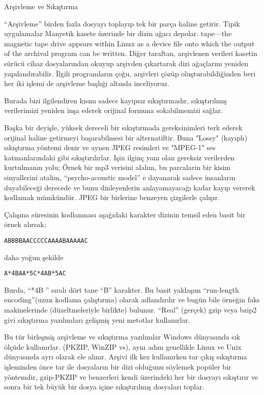 \begin{section}{Arşivleme ve Sıkıştırma}

“Arşivleme” birden fazla dosyayı toplayıp tek bir parça haline getirir. Tipik uygulamalar Manyetik kasete üzerinde bir dizin ağacı depolar. tape—the magnetic tape drive appears within Linux as a device file onto which the output of the archival program can be written. Diğer taraftan, arşivlenen verileri kasetin sürücü cihaz dosyalarından okuyup arşivden çıkartarak dizi ağaçlarını yeniden yapılandırabilir. İlgili programların çoğu, arşivleri
çözüp oluşturabildiğinden beri her iki işlemi de arşivleme başlığı altında inceliyoruz. 

Burada bizi ilgilendiren kısmı sadece kayıpsız sıkıştırmadır, sıkıştırılmış verilerimizi yeniden inşa ederek orijinal formuna sokabilmemizi sağlar.

Başka bir deyişle, yüksek dereceli bir sıkıştırmada gereksinimleri terk ederek orijinal haline getirmeyi başarabilmesi bir alternatiftir. Buna "Lossy" (kayıplı) sıkıştırma yöntemi denir  ve aynen JPEG resimleri ve "MPEG-1" ses katmanlarındaki gibi sıkıştırılırlar. Işin ilginç yanı olan gereksiz verilerden kurtulmanın yolu; Örnek bir mp3 verisini alalım, bu parcalarin bir kisim sinyallerini atalim, “psycho-acoustic model” e dayanarak sadece insanların duyabileceği derecede ve bunu dinleyenlerin anlayamayacağı kadar kayıp vererek kodlamak mümkündür. JPEG bir birlerine benzeyen çizgilerle çalışır.

Çalışma süresinin kodlanması aşağıdaki karakter dizinin temsil eden basit bir örnek alırsak;
\begin{verbatim}
ABBBBAACCCCCAAAABAAAAAC
\end{verbatim}

daha yoğun şekilde
\begin{verbatim}
A*4BAA*5C*4AB*5AC
\end{verbatim}

Burda, “*4B ” sıralı dört tane “B” karakter. Bu basit yaklaşım “run-length encoding”(uzun kodlama çalıştırma) olarak adlandırılır ve bugün bile örneğin faks makinelerinde (düzeltmeleriyle birlikte) bulunur. “Real” (gerçek) gzip veya bzip2 givi sıkıştırma yazılımları gelişmiş yeni metotlar kullanırlar.

Bu tür birleşmiş arşivleme ve sıkıştırma yazılımlar Windows dünyasında sık ölçüde kullanırlar. (PKZIP, WinZIP vs), aynı adım genellikle Linux ve Unix dünyasında ayrı olarak ele alınır. Arşivi ilk kez kullanırken tar çıkış sıkıştırma işleminden önce tar ile dosyaların bir dizi olduğunu söylemek popüler bir yöntemdir, gzip-PKZIP ve benzerleri kendi üzerindeki her bir dosyayı sıkıştırır ve sonra bir tek büyük bir dosya içine sıkıştırılmış dosyaları toplar.


\end{section}
